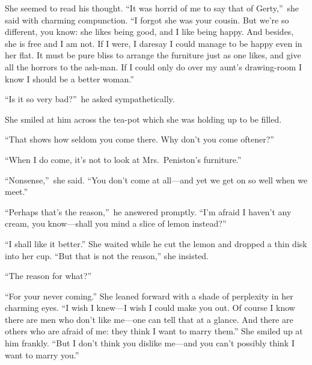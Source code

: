 \documentclass[12pt,a4paper]{book}
\begin{document}
She seemed to read his thought. ``It was horrid of me to say that
of Gerty,''\ she said with charming compunction. ``I forgot she was
your cousin. But we're so different, you know: she likes being
good, and I like being happy. And besides, she is free and I am
not. If I were, I daresay I could manage to be happy even in her
flat. It must be pure bliss to arrange the furniture just as one
likes, and give all the horrors to the ash-man. If I could only
do over my aunt's drawing-room I know I should be a better
woman.''





``Is it so very bad?''\ he asked sympathetically.





She smiled at him across the tea-pot which she was holding up to
be filled.





``That shows how seldom you come there. Why don't you come
oftener?''





``When I do come, it's not to look at Mrs.\ Peniston's furniture.''





``Nonsense,''\ she said. ``You don't come at all---and yet we get on
so well when we meet.''





``Perhaps that's the reason,''\ he answered promptly. ``I'm afraid I
haven't any cream, you know---shall you mind a slice of lemon
instead?''





``I shall like it better.'' She waited while he cut the lemon and
dropped a thin disk into her cup. ``But that is not the reason,''
she insisted.





``The reason for what?''





``For your never coming.'' She leaned forward with a shade of
perplexity in her charming eyes. ``I wish I knew---I wish I could
make you out. Of course I know there are men who don't like
me---one can tell that at a glance. And there are others who are
afraid of me: they think I want to marry them.'' She smiled up at
him frankly. ``But I don't think you dislike me---and you can't
possibly think I want to marry you.''
\end{document}
